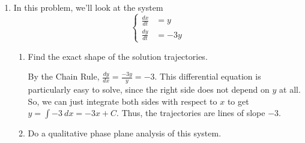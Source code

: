 \documentclass[main]{subfiles}
\begin{document}
\begin{enumerate}
\begin{enumerate}
  \end{enumerate}
  
  
  
  \item 
  In this problem, we'll look at the system 
 \[\left\{\begin{aligned}
  \frac{dx}{dt} &=y\\
  \frac{dy}{dt} &= -3y
  \end{aligned}\right.\]
  \begin{enumerate}
    \item
    \begin{problem}[0.75in]
    Find the exact shape of the solution trajectories.
    \end{problem}

    \begin{solution}
    By the Chain Rule, $\displaystyle \frac{dy}{dx} = \frac{-3y}{y} =
    -3$.  This differential equation is particularly easy to solve,
    since the right side does not depend on $y$ at all.  So, we can just
    integrate both sides with respect to $x$ to get $y = \displaystyle
    \int -3~dx = -3x + C$.  Thus, the trajectories are lines of slope
    $-3$.
    \end{solution}

    \item
    \begin{problem}[3in]
    Do a qualitative phase plane analysis of this system.
    \end{problem}


\end{enumerate}
\end{enumerate}
\end{document}
